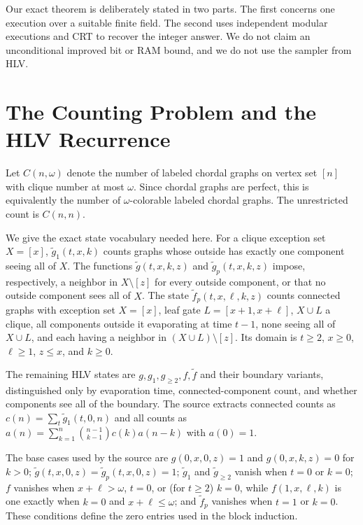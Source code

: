 \documentclass[10pt]{article}
\begin{document}
Our exact theorem is deliberately stated in two parts. The first concerns one execution over a suitable finite field. The second uses independent modular executions and CRT to recover the integer answer. We do not claim an unconditional improved bit or RAM bound, and we do not use the sampler from HLV.

\section{The Counting Problem and the HLV Recurrence}
Let $C(n,\omega)$ denote the number of labeled chordal graphs on vertex set $[n]$ with clique number at most $\omega$. Since chordal graphs are perfect, this is equivalently the number of $\omega$-colorable labeled chordal graphs. The unrestricted count is $C(n,n)$.

We give the exact state vocabulary needed here. For a clique exception set $X=[x]$, $\widetilde g_1(t,x,k)$ counts graphs whose outside has exactly one component seeing all of $X$. The functions $\widetilde g(t,x,k,z)$ and $\widetilde g_p(t,x,k,z)$ impose, respectively, a neighbor in $X\setminus[z]$ for every outside component, or that no outside component sees all of $X$. The state $\widetilde f_p(t,x,\ell,k,z)$ counts connected graphs with exception set $X=[x]$, leaf gate $L=[x+1,x+\ell]$, $X\cup L$ a clique, all components outside it evaporating at time $t-1$, none seeing all of $X\cup L$, and each having a neighbor in $(X\cup L)\setminus[z]$. Its domain is $t\ge2$, $x\ge0$, $\ell\ge1$, $z\le x$, and $k\ge0$.

The remaining HLV states are $g,g_1,g_{\ge2},f,\widetilde f$ and their boundary variants, distinguished only by evaporation time, connected-component count, and whether components see all of the boundary. The source extracts connected counts as $c(n)=\sum_t\widetilde g_1(t,0,n)$ and all counts as $a(n)=\sum_{k=1}^n\binom{n-1}{k-1}c(k)a(n-k)$ with $a(0)=1$.

The base cases used by the source are $g(0,x,0,z)=1$ and $g(0,x,k,z)=0$ for $k>0$; $\widetilde g(t,x,0,z)=\widetilde g_p(t,x,0,z)=1$; $\widetilde g_1$ and $\widetilde g_{\ge2}$ vanish when $t=0$ or $k=0$; $f$ vanishes when $x+\ell>\omega$, $t=0$, or (for $t\ge2$) $k=0$, while $f(1,x,\ell,k)$ is one exactly when $k=0$ and $x+\ell\le\omega$; and $\widetilde f_p$ vanishes when $t=1$ or $k=0$. These conditions define the zero entries used in the block induction.
\end{document}
